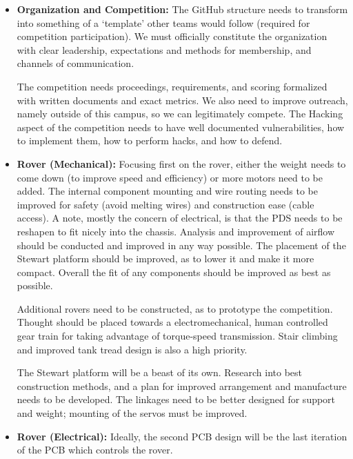 \documentclass[a4paper, 10pt]{article}
\begin{document}
	\begin{itemize}
		\item \textbf{Organization and Competition:} The GitHub structure needs to transform into something of a `template' other teams would follow (required for competition participation). We must officially constitute the organization with clear leadership, expectations and methods for membership, and channels of communication.
		
		The competition needs proceedings, requirements, and scoring formalized with written documents and exact metrics. We also need to improve outreach, namely outside of this campus, so we can legitimately compete. The Hacking aspect of the competition needs to have well documented vulnerabilities, how to implement them, how to perform hacks, and how to defend. 
		
		\item \textbf{Rover (Mechanical):} Focusing first on the rover, either the weight needs to come down (to improve speed and efficiency) or more motors need to be added. The internal component mounting and wire routing needs to be improved for safety (avoid melting wires) and construction ease (cable access). A note, mostly the concern of electrical, is that the PDS needs to be reshapen to fit nicely into the chassis. Analysis and improvement of airflow should be conducted and improved in any way possible. The placement of the Stewart platform should be improved, as to lower it and make it more compact. Overall the fit of any components should be improved as best as possible.
		
		Additional rovers need to be constructed, as to prototype the competition. Thought  should be placed towards a electromechanical, human controlled gear train for taking advantage of torque-speed transmission. Stair climbing and improved tank tread design is also a high priority.
		
		The Stewart platform will be a beast of its own. Research into best construction methods, and a plan for improved arrangement and manufacture needs to be developed. The linkages need to be better designed for support and weight; mounting of the servos must be improved.
		
		\item \textbf{Rover (Electrical):} Ideally, the second PCB design will be the last iteration of the PCB which controls the rover.
		

\end{itemize}
\end{document}
